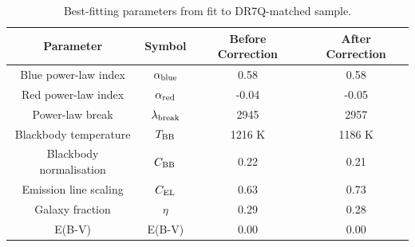 

\begin{table}
  \centering
  \begin{tabular}{c c c c}
    \hline 
    Parameter & Symbol & Before Correction & After Correction \\
    \hline 
    Blue power-law index & $\alpha_{\rm blue}$ & 0.58 & 0.58 \\
    Red power-law index & $\alpha_{\rm red}$ & -0.04 & -0.05 \\
    Power-law break & $\lambda_{\rm break}$ & 2945 & 2957 \\
    Blackbody temperature & $T_{\rm BB}$ & 1216 K & 1186 K \\
    Blackbody normalisation & $C_{\rm BB}$ & 0.22 & 0.21 \\
    Emission line scaling & $C_{\rm EL}$  & 0.63 &  0.73 \\
    Galaxy fraction & $\eta$ & 0.29 & 0.28 \\
    E(B-V) & E(B-V) & 0.00 & 0.00 \\
    \hline
  \end{tabular}
  \caption{Best-fitting parameters from fit to DR7Q-matched sample.}
  \label{tab:params}
\end{table}

